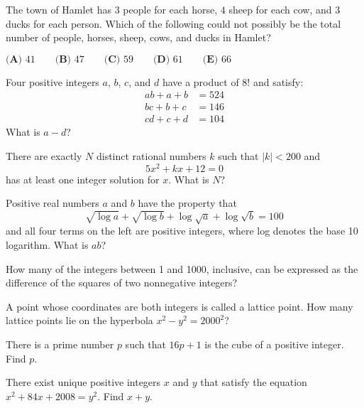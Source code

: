 \documentclass[mast]{lucky}
\begin{document}
\begin{prob}[AMC 10B 2015/15]{4}

The town of Hamlet has $3$ people for each horse, $4$ sheep for each cow, and $3$ ducks for each person. Which of the following could not possibly be the total number of people, horses, sheep, cows, and ducks in Hamlet?
\begin{center}
    $\textbf{(A) }41\qquad\textbf{(B) }47\qquad\textbf{(C) }59\qquad\textbf{(D) }61\qquad\textbf{(E) }66$
\end{center}

\end{prob}

\begin{prob}[AMC 12 2001/21]{6}

Four positive integers $a$, $b$, $c$, and $d$ have a product of $8!$ and satisfy:
\begin{align*} ab + a + b & = 524 \\  bc + b + c & = 146 \\  cd + c + d & = 104 \end{align*}
What is $a-d$?

\end{prob}

\begin{prob}[AMC 12A 2014/19]{6}

There are exactly $N$ distinct rational numbers $k$ such that $|k|<200$ and\[5x^2+kx+12=0\]has at least one integer solution for $x$. What is $N$?

\end{prob}

\begin{prob}[AMC 12A 2019/15]{6}

Positive real numbers $a$ and $b$ have the property that\[\sqrt{\log{a}} + \sqrt{\log{b}} + \log \sqrt{a} + \log \sqrt{b} = 100\]and all four terms on the left are positive integers, where log denotes the base 10 logarithm. What is $ab$?

\end{prob}

\begin{prob}[AIME 1997/1]{6}

How many of the integers between 1 and 1000, inclusive, can be expressed as the difference of the squares of two nonnegative integers?

\end{prob}

\begin{prob}[AIME II 2000/2]{9}

A point whose coordinates are both integers is called a lattice point. How many lattice points lie on the hyperbola $x^2 -y^2 = 2000^2$?

\end{prob}

\begin{prob}[AIME I 2015/3]{9}

There is a prime number $p$ such that $16p+1$ is the cube of a positive integer. Find $p$.

\end{prob}

\begin{prob}[AIME I 2008/4]{9}

There exist unique positive integers $x$ and $y$ that satisfy the equation $x^2 + 84x + 2008 = y^2$. Find $x + y$.

\end{prob}
\end{document}
